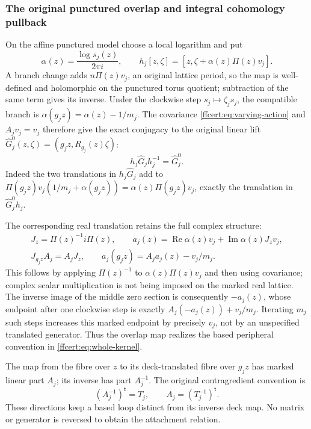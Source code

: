 \subsubsection{The original punctured overlap and integral cohomology pullback}

On the affine punctured model choose a local logarithm and put
\[
 \alpha(z)=\frac{\log s_j(z)}{2\pi i},\qquad
 h_j[z,\zeta]=[z,\zeta+\alpha(z)\Pi(z)v_j].
 \tag{FF36}\label{ffcert:eq:overlap-map}
\]
A branch change adds $n\Pi(z)v_j$, an original lattice period,
so the map is well-defined and holomorphic on the punctured torus
quotient; subtraction of the same term gives its inverse. Under the
clockwise step $s_j\mapsto\zeta_js_j$, the compatible branch is
$\alpha(g_jz)=\alpha(z)-1/m_j$. The covariance
\eqref{ffcert:eq:varying-action} and $A_jv_j=v_j$ therefore give
the exact conjugacy to the original linear lift
$\widehat G_j^0(z,\zeta)=(g_jz,R_{g_j}(z)\zeta)$:
\[
 h_j\widehat G_jh_j^{-1}=\widehat G_j^0.
 \tag{FF37}\label{ffcert:eq:overlap-conjugacy}
\]
Indeed the two translations in $h_j\widehat G_j$ add to
$\Pi(g_jz)v_j(1/m_j+\alpha(g_jz))
=\alpha(z)\Pi(g_jz)v_j$, exactly the translation in
$\widehat G_j^0h_j$.

The corresponding real translation retains the full complex structure:
\[
\begin{gathered}
 J_z=\Pi(z)^{-1}i\Pi(z),\qquad
 a_j(z)=\operatorname{Re}\alpha(z)v_j
               +\operatorname{Im}\alpha(z)J_zv_j,\\
 J_{g_jz}A_j=A_jJ_z,\qquad
 a_j(g_jz)=A_ja_j(z)-v_j/m_j.
\end{gathered}
\tag{FF38}\label{ffcert:eq:real-overlap}
\]
This follows by applying $\Pi(z)^{-1}$ to
$\alpha(z)\Pi(z)v_j$ and then using covariance; complex scalar
multiplication is not being imposed on the marked real lattice.
The inverse image of the middle zero section is consequently
$-a_j(z)$, whose endpoint after one clockwise step is exactly
$A_j(-a_j(z))+v_j/m_j$. Iterating $m_j$ such steps increases
this marked endpoint by precisely $v_j$, not by an unspecified
translated generator. Thus the overlap map realizes the based
peripheral convention in \eqref{ffcert:eq:whole-kernel}.

The map from the fibre over $z$ to its deck-translated fibre over
$g_jz$ has marked linear part $A_j$; its inverse has part
$A_j^{-1}$. The original contragredient convention is
\[
 (A_j^{-1})^{\mathsf t}=T_j,
 \qquad A_j=(T_j^{-1})^{\mathsf t}.
 \tag{FF39}\label{ffcert:eq:contragredient-direction}
\]
These directions keep a based loop distinct from its inverse deck
map. No matrix or generator is reversed to obtain the attachment relation.

